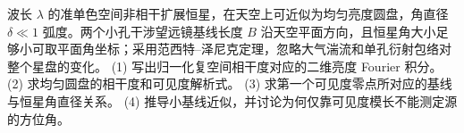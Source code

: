 波长 \(\lambda\) 的准单色空间非相干扩展恒星，在天空上可近似为均匀亮度圆盘，角直径 \(\delta\ll1\) 弧度。两个小孔干涉望远镜基线长度 \(B\) 沿天空平面方向，且恒星角大小足够小可取平面角坐标；采用范西特--泽尼克定理，忽略大气湍流和单孔衍射包络对整个星盘的变化。
(1) 写出归一化复空间相干度对应的二维亮度 Fourier 积分。
(2) 求均匀圆盘的相干度和可见度解析式。
(3) 求第一个可见度零点所对应的基线与恒星角直径关系。
(4) 推导小基线近似，并讨论为何仅靠可见度模长不能测定源的方位角。

